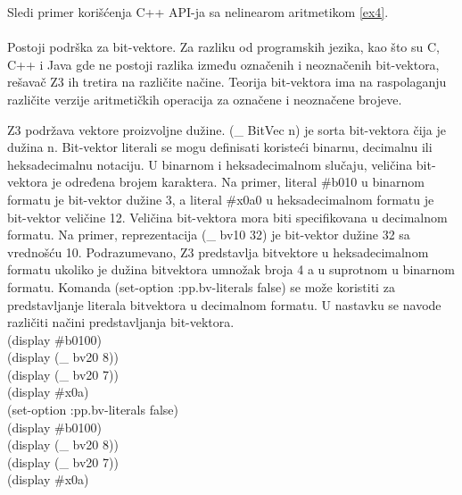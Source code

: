 \documentclass[12pt,oneside]{memoir}
\begin{document}
Sledi primer korišćenja C++ API-ja sa nelinearom aritmetikom \ref{ex4}. 
\\ \\




Postoji podrška za bit-vektore. Za razliku od programskih jezika, kao što su C, C++ i Java gde ne postoji razlika između označenih i neoznačenih bit-vektora, rešavač Z3 ih tretira na različite načine. Teorija bit-vektora ima na raspolaganju različite verzije aritmetičkih operacija za označene i neoznačene brojeve.

Z3 podržava vektore proizvoljne dužine. (\_ BitVec n) je sorta bit-vektora čija je dužina n. Bit-vektor literali se mogu definisati koristeći binarnu, decimalnu ili heksadecimalnu notaciju. U binarnom i heksadecimalnom slučaju, veličina bit-vektora je određena brojem karaktera. Na primer, literal \#b010 u binarnom formatu je bit-vektor dužine 3, a literal \#x0a0 u heksadecimalnom formatu je bit-vektor veličine 12. Veličina bit-vektora mora biti specifikovana u decimalnom formatu. Na primer, reprezentacija (\_ bv10 32) je bit-vektor dužine 32 sa vrednošću 10. Podrazumevano, Z3 predstavlja bitvektore u heksadecimalnom formatu ukoliko je dužina bitvektora umnožak broja 4 a u suprotnom u binarnom formatu. Komanda 
(set-option :pp.bv-literals false) se može koristiti za predstavljanje literala bitvektora u decimalnom formatu. U nastavku se navode različiti načini predstavljanja bit-vektora.
\\(display \#b0100)
\\(display (\_ bv20 8))
\\(display (\_ bv20 7))
\\(display \#x0a) 
\\(set-option :pp.bv-literals false)
\\(display \#b0100)
\\(display (\_ bv20 8))
\\(display (\_ bv20 7))
\\(display \#x0a)
\\
\end{document}
